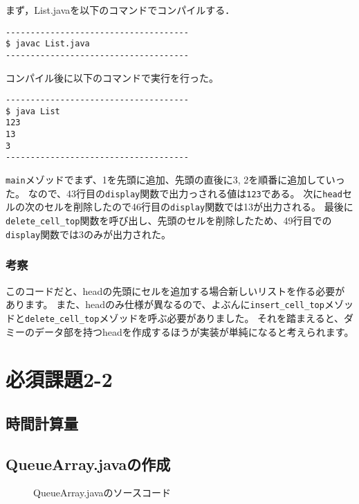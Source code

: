 \documentclass[10.5pt,a4paper]{jsarticle}
\begin{document}
まず，List.javaを以下のコマンドでコンパイルする．
\begin{verbatim}
-------------------------------------
$ javac List.java
-------------------------------------
\end{verbatim}

コンパイル後に以下のコマンドで実行を行った。

\begin{verbatim}
-------------------------------------
$ java List
123
13
3
-------------------------------------
\end{verbatim}

\texttt{main}メゾッドでまず、1を先頭に追加、先頭の直後に3, 2を順番に追加していった。
なので、43行目の\texttt{display}関数で出力っされる値は\texttt{123}である。
次に\texttt{head}セルの次のセルを削除したので46行目の\texttt{display}関数では13が出力される。
最後に\texttt{delete_cell_top}関数を呼び出し、先頭のセルを削除したため、49行目での\texttt{display}関数では3のみが出力された。

\subsubsection{考察}

このコードだと、headの先頭にセルを追加する場合新しいリストを作る必要があります。
また、headのみ仕様が異なるので、よぶんに\texttt{insert_cell_top}メゾッドと\texttt{delete_cell_top}メゾッドを呼ぶ必要がありました。
それを踏まえると、ダミーのデータ部を持つheadを作成するほうが実装が単純になると考えられます。

\section{必須課題2-2}

\subsection{時間計算量}

\subsection{QueueArray.javaの作成}

\begin{figure}[t]
  \begin{center}
   
   \caption{QueueArray.javaのソースコード}
   \label{code:QueueArray}
  \end{center}
 \end{figure}
\end{document}
